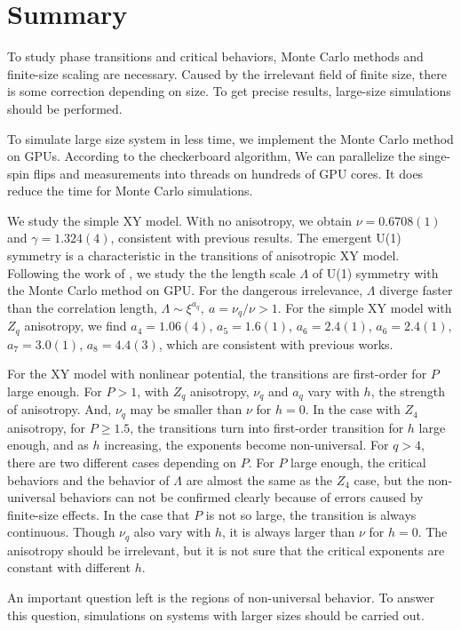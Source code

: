 \chapter{Summary}
\label{chapter:summary}
To study phase transitions and critical behaviors, Monte Carlo methods and finite-size scaling are necessary. Caused by the irrelevant field of finite size, there is some correction depending on size.
To get precise results, large-size simulations should be performed.

To simulate large size system in less time, we implement the Monte Carlo method on GPUs.
According to the checkerboard algorithm, We can parallelize the singe-spin flips and measurements into threads on hundreds of GPU cores.
It does reduce the time for Monte Carlo simulations.

We study the simple XY model. With no anisotropy, we obtain $\nu = 0.6708(1)$ and $\gamma=1.324(4)$, consistent with previous results.
The emergent U(1) symmetry is a characteristic in the transitions of anisotropic XY model.
Following the work of \citeauthor{lou_emergence_2007}, we study the the length scale $\Lambda$ of U(1) symmetry with the Monte Carlo method on GPU.
For the  dangerous irrelevance, $\Lambda$ diverge faster than the correlation length, $\Lambda\sim \xi^{a_q},\ a=\nu_q/\nu>1$.
For the simple XY model with $Z_q$ anisotropy, we find $a_4=1.06(4)$, $a_5=1.6(1)$, $a_6=2.4(1)$, $a_6=2.4(1)$, $a_7=3.0(1)$, $a_8=4.4(3)$, which are consistent with previous works.

For the XY model with nonlinear potential, the transitions are first-order for $P$ large enough.
For $P>1$, with $Z_q$ anisotropy, $\nu_q$ and $a_q$ vary with $h$, the strength of anisotropy. And, $\nu_q$ may be smaller than $\nu$ for $h=0$.
In the case with $Z_4$ anisotropy, for $P\geq1.5$, the transitions turn into first-order transition for $h$ large enough, and as $h$ increasing, the exponents become non-universal.
For $q>4$, there are two different cases depending on $P$.
For $P$ large enough, the critical behaviors and the behavior of $\Lambda$ are almost the same as the $Z_4$ case, but the non-universal behaviors can not be confirmed clearly because of errors caused by finite-size effects.
In the case that $P$ is not so large, the transition is always continuous.
Though $\nu_q$ also vary with $h$, it is always larger than $\nu$ for $h=0$.
The anisotropy should be irrelevant, but it is not sure that the critical exponents are constant with different $h$.

An important question left is the regions of non-universal behavior.
To answer this question, simulations on systems with larger sizes should be carried out.
